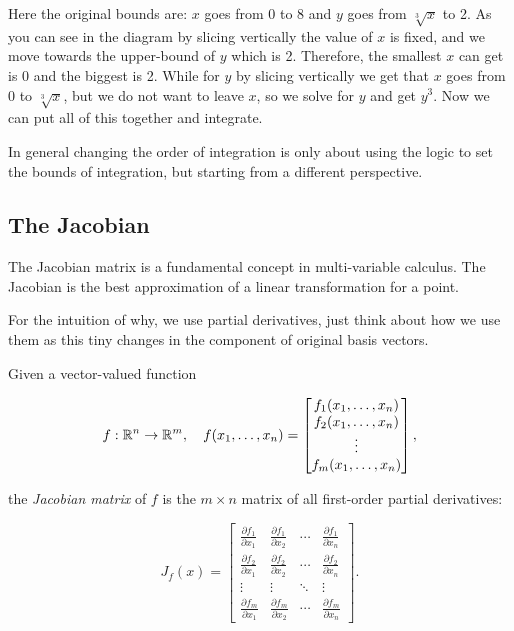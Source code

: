 Here the original bounds are: \(x\) goes from 0 to 8 and \(y\) goes from \(\sqrt[3]{x}\) to 2.
As you can see in the diagram by slicing vertically the value of \(x\) is fixed, and we move 
towards the upper-bound of \(y\) which is 2.
Therefore, the smallest \(x\) can get is 0 and the biggest is 2. While for \(y\) by slicing 
vertically we get that \(x\) goes from 0 to \(\sqrt[3]{x}\), but 
we do not want to leave \(x\), so we solve for \(y\) and get \(y^3\). 
Now we can put all of this together and integrate.

In general changing the order of integration is only about using the logic to set the bounds of integration, 
but starting from a different perspective.

\subsection{The Jacobian}

The Jacobian matrix is a fundamental concept in multi-variable calculus. The Jacobian is the best
approximation of a linear transformation for a point.

For the intuition of why, we use partial derivatives, just think about
how we use them as this tiny changes in the component of original
basis vectors.

Given a vector-valued function

\[
    f : \mathbb{R}^n \rightarrow \mathbb{R}^m, \quad f(x_1, \ldots, x_n) = 
    \begin{bmatrix}
    f_1(x_1, \ldots, x_n) \\
    f_2(x_1, \ldots, x_n) \\
    \vdots \\
    f_m(x_1, \ldots, x_n)
    \end{bmatrix},
\]

the \emph{Jacobian matrix} of \(f\) is the \(m \times n\) matrix of all first-order partial derivatives:

\[
    J_f(x) = 
    \begin{bmatrix}
    \frac{\partial f_1}{\partial x_1} & \frac{\partial f_1}{\partial x_2} & \cdots & \frac{\partial f_1}{\partial x_n} \\
    \frac{\partial f_2}{\partial x_1} & \frac{\partial f_2}{\partial x_2} & \cdots & \frac{\partial f_2}{\partial x_n} \\
    \vdots & \vdots & \ddots & \vdots \\
    \frac{\partial f_m}{\partial x_1} & \frac{\partial f_m}{\partial x_2} & \cdots & \frac{\partial f_m}{\partial x_n}
    \end{bmatrix}.
\]

